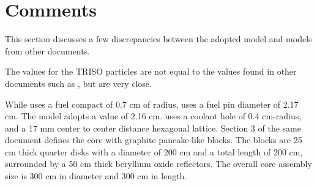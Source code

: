 \documentclass[11pt,letterpaper]{article}
\begin{document}
\section{Comments}
\label{sec:comments}

This section discusses a few discrepancies between the adopted model and models from other documents.

The values for the TRISO particles are not equal to the values found in other documents such as \cite{venneri_neutronic_2015}, but are very close.

While \cite{venneri_neutronic_2015} uses a fuel compact of 0.7 cm of radius, \cite{hawari_development_2018} uses a fuel pin diameter of 2.17 cm. The model adopts a value of 2.16 cm.
\cite{venneri_neutronic_2015} uses a coolant hole of 0.4 cm-radius, and a 17 mm center to center distance hexagonal lattice.
Section 3 of the same document defines the core with graphite pancake-like blocks.
The blocks are 25 cm thick quarter disks with a diameter of 200 cm and a total length of 200 cm, surrounded by a 50 cm thick beryllium oxide reflectors.
The overall core assembly size is 300 cm in diameter and 300 cm in length.

\pagebreak


\end{document}
